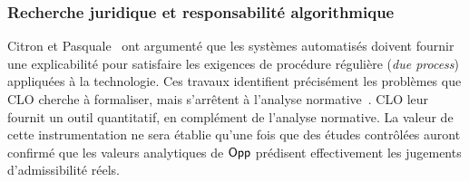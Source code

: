 \begin{sloppypar}
\subsubsection{Recherche juridique et responsabilit\'e algorithmique}
\label{subsubsec:recherche_juridique}

Citron et Pasquale~\cite{Citron2008,Citron14} ont argument\'e que les
syst\`emes automatis\'es doivent fournir une explicabilit\'e pour
satisfaire les exigences de proc\'edure r\'eguli\`ere (\emph{due process}) appliqu\'ees \`a la technologie. Ces travaux
identifient pr\'ecis\'ement les probl\`emes que CLO cherche \`a
formaliser, mais s'arr\^etent \`a l'analyse
normative~\cite{Casey11,Kerr04}. CLO leur fournit un outil
quantitatif, en compl\'ement de l'analyse normative. La valeur de cette
instrumentation ne sera \'etablie qu'une fois que des \'etudes
contr\^ol\'ees auront confirm\'e que les valeurs analytiques de $\mathsf{Opp}$
pr\'edisent effectivement les jugements d'admissibilit\'e r\'eels.
\end{sloppypar}

